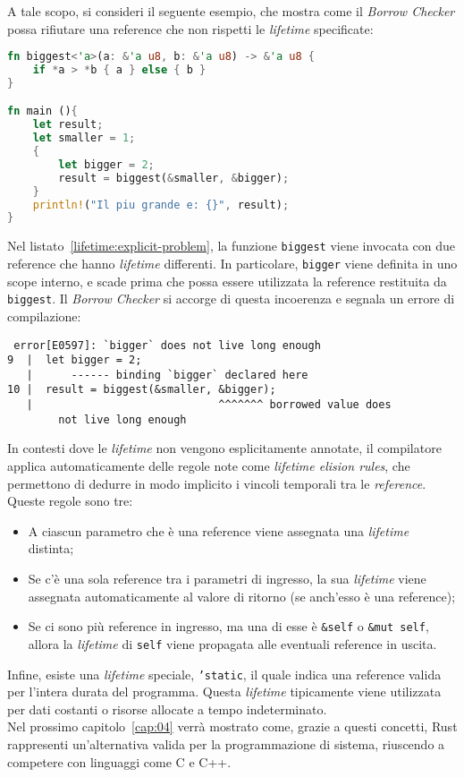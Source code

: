A tale scopo, si consideri il seguente esempio, che mostra come il \textit{Borrow Checker} possa rifiutare una reference che non rispetti le \textit{lifetime} specificate:
\begin{lstlisting}[language=Rust, caption={Limitazioni delle \textit{lifetime}}, label={lifetime:explicit-problem}]
fn biggest<'a>(a: &'a u8, b: &'a u8) -> &'a u8 {
    if *a > *b { a } else { b }
}

fn main (){
    let result;
    let smaller = 1;
    {
        let bigger = 2;
        result = biggest(&smaller, &bigger);
    }
    println!("Il piu grande e: {}", result);
}
\end{lstlisting}
Nel listato~\ref{lifetime:explicit-problem}, la funzione \texttt{biggest} viene invocata con due reference che hanno \textit{lifetime} differenti. In particolare, \texttt{bigger} viene definita in uno scope interno, e scade prima che possa essere utilizzata la reference restituita da \texttt{biggest}. Il \textit{Borrow Checker} si accorge di questa incoerenza e segnala un errore di compilazione:
\begin{verbatim}
 error[E0597]: `bigger` does not live long enough
9  |  let bigger = 2;
   |      ------ binding `bigger` declared here
10 |  result = biggest(&smaller, &bigger);
   |                             ^^^^^^^ borrowed value does
        not live long enough 
\end{verbatim}
\vspace{5pt}
In contesti dove le \textit{lifetime} non vengono esplicitamente annotate, il compilatore applica automaticamente delle regole note come \textit{lifetime elision rules}, che permettono di dedurre in modo implicito i vincoli temporali tra le \textit{reference}. Queste regole sono tre:
\begin{itemize}
    \item A ciascun parametro che è una reference viene assegnata una \textit{lifetime} distinta;
    \item Se c'è una sola reference tra i parametri di ingresso, la sua \textit{lifetime} viene assegnata automaticamente al valore di ritorno (se anch'esso è una reference);
    \item Se ci sono più reference in ingresso, ma una di esse è \texttt{\&self} o \texttt{\&mut self}, allora la \textit{lifetime} di \texttt{self} viene propagata alle eventuali reference in uscita.
\end{itemize}
Infine, esiste una \textit{lifetime} speciale, \texttt{'static}, il quale indica una reference valida per l'intera durata del programma. Questa \textit{lifetime} tipicamente viene utilizzata per dati costanti o risorse allocate a tempo indeterminato.\hfill
\vspace{25pt}\\
\noindent Nel prossimo capitolo~\ref{cap:04} verrà mostrato come, grazie a questi concetti, Rust rappresenti un'alternativa valida
per la programmazione di sistema, riuscendo a competere con linguaggi come C e C++.